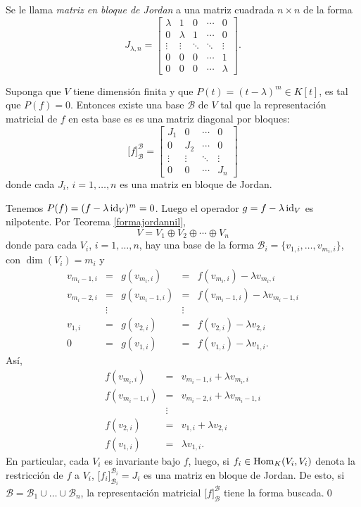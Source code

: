 \begin{defn}
Se le llama \emph{matriz en bloque de Jordan} a una matriz cuadrada $n\times n$ de la forma
\[
J_{\lambda,n}=\left[\begin{array}{ccccc}
\lambda & 1 & 0 &\cdots & 0\\
0 & \lambda & 1 &\cdots & 0\\
\vdots & \vdots & \ddots &\ddots & \vdots\\
0 & 0 & 0 & \cdots & 1\\
0 & 0 & 0 & \cdots & \lambda
\end{array}\right].
\]
\end{defn}

\begin{lema}
Suponga que $V$ tiene dimensi\'on finita y que $P(t)=(t-\lambda)^m\in K[t]$, es tal que $P(f)=0$. Entonces existe una base $\mathcal{B}$ de $V$ tal que la representaci\'on matricial de $f$ en esta base es
es una matriz diagonal por bloques:
\[
\Big[f\Big]^{\mathcal{B}}_{\mathcal{B}}=\left[\begin{array}{c|c|c|c}
J_1 & 0 & \cdots & 0\\
\hline
0 & J_2 & \cdots & 0\\
\hline
\vdots & \vdots & \ddots & \vdots\\
\hline
0 & 0 & \cdots & J_n
\end{array}\right] 
\]
donde cada $J_i$, $i=1,\ldots,n$ es una matriz en bloque de Jordan.
\end{lema}

\dem Tenemos $P(f)=(f-\lambda\operatorname{id}_V)^m=0$. Luego el operador $g=f-\lambda\operatorname{id}_V$ es nilpotente. Por Teorema \ref{formajordannil},
\[
V=V_1\oplus V_2\oplus\cdots\oplus V_n
\]
donde para cada $V_i$, $i=1,\ldots, n$, hay una base de la forma $\mathcal{B}_i=\{v_{1,i},\ldots,v_{m_i,i}\}$, con $\dim(V_i)=m_i$ y
\[
\begin{array}{rcccl}
v_{m_i-1,i} & = & g(v_{m_i,i}) & = & f(v_{m_i,i})-\lambda v_{m_i,i}\\
v_{m_i-2,i} & = & g(v_{m_i-1,i}) & = & f(v_{m_i-1,i})-\lambda v_{m_i-1,i}\\
 & \vdots & & \vdots & \\
v_{1,i} & = & g(v_{2,i}) & = & f(v_{2,i})-\lambda v_{2,i}\\
0 & = & g(v_{1,i}) & = & f(v_{1,i})-\lambda v_{1,i}.
\end{array}
\]
As\'i,
\begin{eqnarray*}
f(v_{m_i,i}) & = & v_{m_i-1,i}+\lambda v_{m_i,i}\\
f(v_{m_i-1,i}) & = & v_{m_i-2,i}+\lambda v_{m_i-1,i}\\
 & \vdots & \\
f(v_{2,i}) & = & v_{1,i}+\lambda v_{2,i}\\
f(v_{1,i}) & = & \lambda v_{1,i}.
\end{eqnarray*}
En particular, cada $V_i$ es invariante bajo $f$, luego, si $f_i\in\operatorname{Hom}_K(V_i,V_i)$ denota la restricci\'on de $f$ a $V_i$,
$\Big[f_i\Big]^{\mathcal{B}_i}_{\mathcal{B}_i}=J_i$ es una matriz en bloque de Jordan. De esto, si $\mathcal{B}=\mathcal{B}_1\cup\ldots\cup \mathcal{B}_n$, la representaci\'on matricial $\Big[f\Big]^{\mathcal{B}}_{\mathcal{B}}$ tiene la forma buscada.\qed


